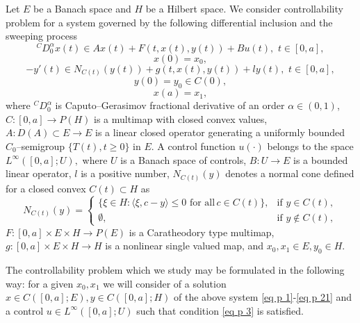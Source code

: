 \documentclass[12pt]{llncs}
\begin{document}
Let $E$ be a Banach space and $H$ be a Hilbert space. We consider controllability problem for a system governed by the following differential inclusion and the sweeping process 
\begin{equation}\label{eq p 1}
^{C}D^{\alpha}_0 x(t)\in Ax(t)+F(t,x(t),y(t))+Bu(t), \,\, t\in [0,a],
\end{equation}
\begin{equation}\label{eq p 11}
x(0)=x_0,
\end{equation}
\begin{equation}\label{eq p 2}
-y'(t)\in N_{C(t)}(y(t))+g(t,x(t),y(t))+l y(t), \,\, t\in [0,a],
\end{equation}
\begin{equation}\label{eq p 21}
y(0)=y_0\in C(0),
\end{equation}
\begin{equation}
\label{eq p 3}
x(a)=x_{1},
\end{equation}
where $^{C}D^{\alpha}_0$ is Caputo--Gerasimov fractional derivative of an order $\alpha\in(0,1)$, $C:[0,a]\to P(H)$ is a multimap with closed convex values, $A: D(A)\subset E\to E$ is a linear closed operator generating a uniformly bounded $C_{0}$--semigroup $\lbrace T(t), t\geq 0 \rbrace $ in $E.$ A control function $u(\cdot)$ belongs to the space $L^{\infty}([0,a];U),$ where $U$ is a Banach space of controls, $B:U\rightarrow E$ is a bounded linear operator, $l$ is a positive number,  $N_{C(t)}(y)$ denotes a normal cone defined for a closed convex $C(t)\subset H$ as
\begin{equation}\label{conus}
N_{C(t)} (y)=
 \begin{cases}
   \lbrace \xi \in H: \langle \xi, c-y \rangle\leq 0 \,\, \mbox{for all}\, c\in C(t)\rbrace, &\text{if $y \in C(t)$},\\
  \emptyset,  &\text{if $y \notin C(t)$},
 \end{cases}
\end{equation}
$F: [0,a]\times E \times H \to P(E)$ is a Caratheodory type multimap, $g: [0,a]\times E \times H \to H$ is a nonlinear single valued map, and $x_0, x_1\in E, y_0\in H.$ 

The controllability problem which we study may be formulated in the following way: for a given  $x_0, x_{1}$ we will consider of a solution $x \in C([0,a];E), y \in C([0,a];H)$    of the above system \eqref{eq p 1}-\eqref{eq p 21} and a control $u \in L^{\infty}([0,a];U)$ such that condition \eqref{eq p 3} is satisfied.
\end{document}
